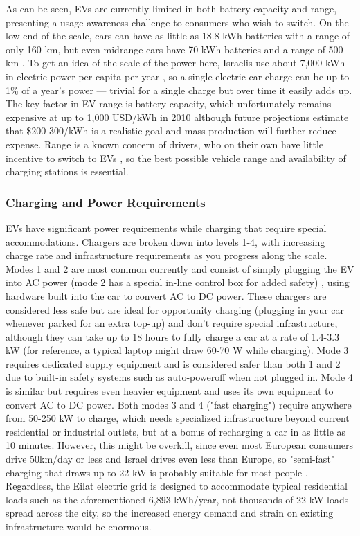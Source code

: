 \documentclass[12pt]{article}                         %
\begin{document}
As can be seen, EVs are currently limited in both battery capacity and range, presenting a usage-awareness challenge to consumers who wish to switch. On the low end of the scale, cars can have as little as 18.8 kWh batteries with a range of only 160 km, but even midrange cars have 70 kWh batteries and a range of 500 km \cite{Glon2018HeresPerformance}. To get an idea of the scale of the power here, Israelis use about 7,000 kWh in electric power per capita per year \cite{2018Key2018}, so a single electric car charge can be up to 1\% of a year's power --- trivial for a single charge but over time it easily adds up. The key factor in EV range is battery capacity, which unfortunately remains expensive at up to 1,000 USD/kWh in 2010 \cite{Mock2010MarketVehicles} although future projections estimate that \$200-300/kWh is a realistic goal and mass production will further reduce expense. Range is a known concern of drivers, who on their own have little incentive to switch to EVs \cite{Mock2010MarketVehicles}, so the best possible vehicle range and availability of charging stations is essential.

\subsubsection{Charging and Power Requirements}
EVs have significant power requirements while charging that require special accommodations. Chargers are broken down into levels 1-4, with increasing charge rate and infrastructure requirements as you progress along the scale. Modes 1 and 2 are most common currently and consist of simply plugging the EV into AC power (mode 2 has a special in-line control box for added safety) \cite{Bossche2010ElectricInfrastructure}, using hardware built into the car to convert AC to DC power. These chargers are considered less safe but are ideal for opportunity charging (plugging in your car whenever parked for an extra top-up) and don't require special infrastructure, although they can take up to 18 hours to fully charge a car at a rate of 1.4-3.3 kW \cite{Ustun2015ImpactSystems} (for reference, a typical laptop might draw 60-70 W while charging). Mode 3 requires dedicated supply equipment and is considered safer than both 1 and 2 due to built-in safety systems such as auto-poweroff when not plugged in. Mode 4 is similar but requires even heavier equipment and uses its own equipment to convert AC to DC power. Both modes 3 and 4 ("fast charging") require anywhere from 50-250 kW \cite{Ustun2015ImpactSystems, Bossche2010ElectricInfrastructure} to charge, which needs specialized infrastructure beyond current residential or industrial outlets, but at a bonus of recharging a car in as little as 10 minutes. However, this might be overkill, since even most European consumers drive 50km/day or less and Israel drives even less than Europe, so "semi-fast" charging that draws up to 22 kW is probably suitable for most people \cite{Bossche2010ElectricInfrastructure}. Regardless, the Eilat electric grid is designed to accommodate typical residential loads such as the aforementioned 6,893 kWh/year, not thousands of 22 kW loads spread across the city, so the increased energy demand and strain on existing infrastructure would be enormous.
\end{document}
